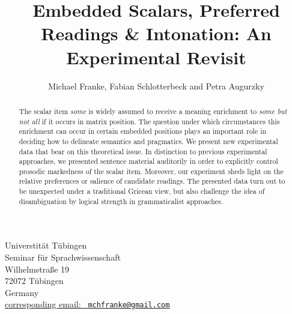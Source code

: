\documentclass[fleqn,reqno,12pt]{article}
\title{Embedded Scalars, Preferred Readings \& Intonation: {A}n
  Experimental Revisit}
\author{Michael Franke, Fabian Schlotterbeck and Petra Augurzky
}
\date{}
\begin{document}
\maketitle

\thispagestyle{empty}

\vspace*{-1cm}
\begin{center}
  Universtit\"at T\"ubingen \\
  Seminar f\"ur Sprachwissenschaft \\
  Wilhelmstra\ss e 19\\
  72072 T\"ubingen\\
  Germany  \\
  \bigskip \href{mailto:mchfranke@gmail.com}{corresponding email: \tt
    mchfranke@gmail.com}
\end{center}

 \vspace*{1cm}



\begin{abstract}
  The scalar item \emph{some} is widely assumed to receive a meaning enrichment to \emph{some
    but not all} if it occurs in matrix position. The question under which circumstances this
  enrichment can occur in certain embedded positions plays an important role in deciding how to
  delineate semantics and pragmatics.  We present new experimental data that bear on this
  theoretical issue. In distinction to previous experimental approaches, we presented sentence
  material auditorily in order to explicitly control prosodic markedness of the scalar
  item. Moreover, our experiment sheds light on the relative preferences or salience of
  candidate readings. The presented data turn out to be unexpected under a traditional Gricean
  view, but also challenge the idea of disambiguation by logical strength in grammaticalist
  approaches.
\end{abstract}
\end{document}

